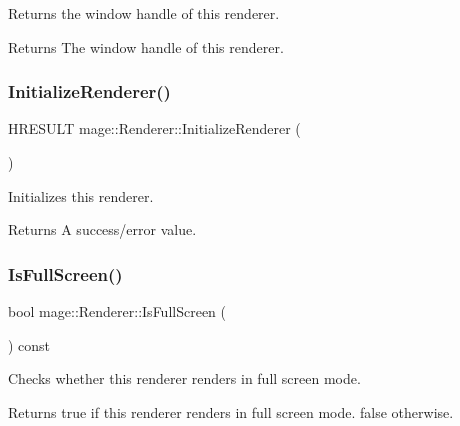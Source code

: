 Returns the window handle of this renderer.

\begin{DoxyReturn}{Returns}
The window handle of this renderer. 
\end{DoxyReturn}
\hypertarget{classmage_1_1_renderer_aafed50e7e14ca597541c091941351929}{}\label{classmage_1_1_renderer_aafed50e7e14ca597541c091941351929} 
\subsubsection{\texorpdfstring{Initialize\+Renderer()}{InitializeRenderer()}}
{\footnotesize\ttfamily H\+R\+E\+S\+U\+LT mage\+::\+Renderer\+::\+Initialize\+Renderer (\begin{DoxyParamCaption}{ }\end{DoxyParamCaption})\hspace{0.3cm}{\ttfamily [protected]}}

Initializes this renderer.

\begin{DoxyReturn}{Returns}
A success/error value. 
\end{DoxyReturn}
\hypertarget{classmage_1_1_renderer_a5ae3220e19c68f47a8e4d55e3ced4694}{}\label{classmage_1_1_renderer_a5ae3220e19c68f47a8e4d55e3ced4694} 
\subsubsection{\texorpdfstring{Is\+Full\+Screen()}{IsFullScreen()}}
{\footnotesize\ttfamily bool mage\+::\+Renderer\+::\+Is\+Full\+Screen (\begin{DoxyParamCaption}{ }\end{DoxyParamCaption}) const}

Checks whether this renderer renders in full screen mode.

\begin{DoxyReturn}{Returns}
{\ttfamily true} if this renderer renders in full screen mode. {\ttfamily false} otherwise. 
\end{DoxyReturn}
\hypertarget{classmage_1_1_renderer_a1de1804c1eedae7dc12435a520a10b9c}{}\label{classmage_1_1_renderer_a1de1804c1eedae7dc12435a520a10b9c} 
